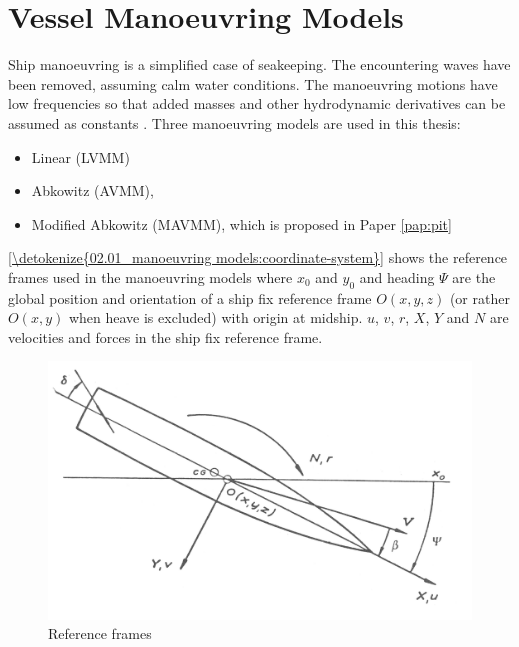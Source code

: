 \section{Vessel Manoeuvring Models} \label{sec:manoeuvring model}
\label{\detokenize{02.01_manoeuvring models:vessel-manoeuvring-models}}\label{\detokenize{02.01_manoeuvring models:vmm}}\label{\detokenize{02.01_manoeuvring models::doc}}
Ship manoeuvring is a simplified case of seakeeping. The encountering waves have been removed, assuming calm water conditions. The manoeuvring motions have low frequencies so that added masses and other hydrodynamic derivatives can be assumed as constants  \cite{fossen_handbook_2021}. Three manoeuvring models are used in this thesis: 
\begin{itemize}
    \item Linear (LVMM) \cite{matusiak_dynamics_2017}
    \item Abkowitz (AVMM), \cite{abkowitz_ship_1964}
    \item Modified Abkowitz (MAVMM), which is proposed in Paper \ref{pap:pit}
\end{itemize}

\noindent\autoref{\detokenize{02.01_manoeuvring models:coordinate-system}} shows the reference frames used in the manoeuvring models where \(x_0\) and \(y_0\) and heading \(\Psi\) are the global position and orientation of a ship fix reference frame \(O(x,y,z)\) (or rather \(O(x,y)\) when heave is excluded) with origin at midship. \(u\), \(v\), \(r\), \(X\), \(Y\) and \(N\) are velocities and forces in the ship fix reference frame.



\begin{figure}[H]
    \centering
    \includegraphics[width=\textwidth]{kappa/images/coordinate_system.PNG}
    \caption{Reference frames}
    \label{\detokenize{02.01_manoeuvring models:coordinate-system}}
\end{figure}

